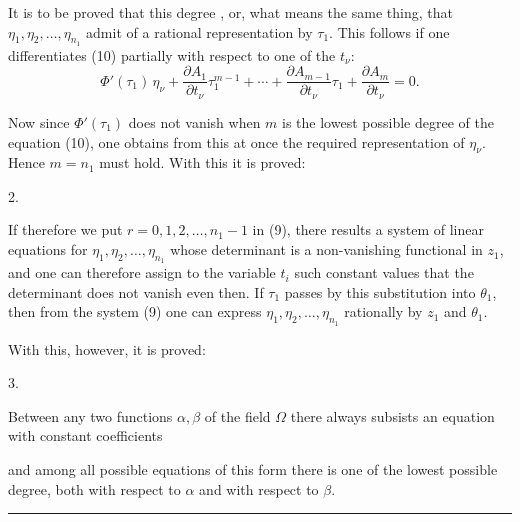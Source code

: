It is to be proved that this degree , or, what
means the same thing, that $\eta_1, \eta_2, \ldots, \eta_{n_1}$ admit of
a rational representation by $\tau_1$. This follows if one
differentiates (10) partially with respect to one of the $t_\nu$:
\[
\Phi'(\tau_1)\,\eta_\nu + \frac{\partial A_1}{\partial t_\nu}\tau_1^{m-1}
+ \cdots + \frac{\partial A_{m-1}}{\partial t_\nu}\tau_1
+ \frac{\partial A_m}{\partial t_\nu} = 0.
\]

Now since $\Phi'(\tau_1)$ does not vanish when $m$ is the lowest
possible degree of the equation (10), one obtains from this at once the
required representation of $\eta_\nu$. Hence $m = n_1$ must hold. With
this it is proved:

2. 

If therefore we put $r = 0, 1, 2, \ldots, n_1-1$ in (9), there results a
system of linear equations for $\eta_1, \eta_2, \ldots, \eta_{n_1}$
whose determinant is a non-vanishing functional in $z_1$, and one can
therefore assign to the variable $t_i$ such constant values that the
determinant does not vanish even then. If $\tau_1$ passes by this
substitution into $\theta_1$, then from the system (9) one can express
$\eta_1, \eta_2, \ldots, \eta_{n_1}$ rationally by $z_1$ and $\theta_1$.

With this, however, it is proved:

3. 

Between any two functions $\alpha, \beta$ of the field $\Omega$ there
always subsists an equation with constant coefficients

and among all possible equations of this form there is one of the lowest
possible degree, both with respect to $\alpha$ and with respect to
$\beta$.

\begin{center}
\rule{4cm}{0.4pt}
\end{center}
